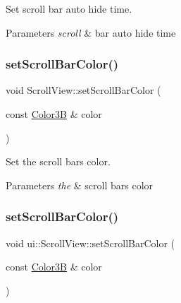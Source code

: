 Set scroll bar auto hide time. 


\begin{DoxyParams}{Parameters}
{\em scroll} & bar auto hide time \\
\hline
\end{DoxyParams}
\mbox{\label{classui_1_1ScrollView_a91d773f31ffb7c35c6a860bc6ceea697}} 
\subsubsection{\texorpdfstring{set\+Scroll\+Bar\+Color()}{setScrollBarColor()}\hspace{0.1cm}{\footnotesize\ttfamily [1/2]}}
{\footnotesize\ttfamily void Scroll\+View\+::set\+Scroll\+Bar\+Color (\begin{DoxyParamCaption}\item[{const \hyperlink{structColor3B}{Color3B} \&}]{color }\end{DoxyParamCaption})}



Set the scroll bar\textquotesingle{}s color. 


\begin{DoxyParams}{Parameters}
{\em the} & scroll bar\textquotesingle{}s color \\
\hline
\end{DoxyParams}
\mbox{\label{classui_1_1ScrollView_a8429ec3c7148b14bb8007d58473f7cb8}} 
\subsubsection{\texorpdfstring{set\+Scroll\+Bar\+Color()}{setScrollBarColor()}\hspace{0.1cm}{\footnotesize\ttfamily [2/2]}}
{\footnotesize\ttfamily void ui\+::\+Scroll\+View\+::set\+Scroll\+Bar\+Color (\begin{DoxyParamCaption}\item[{const \hyperlink{structColor3B}{Color3B} \&}]{color }\end{DoxyParamCaption})}




